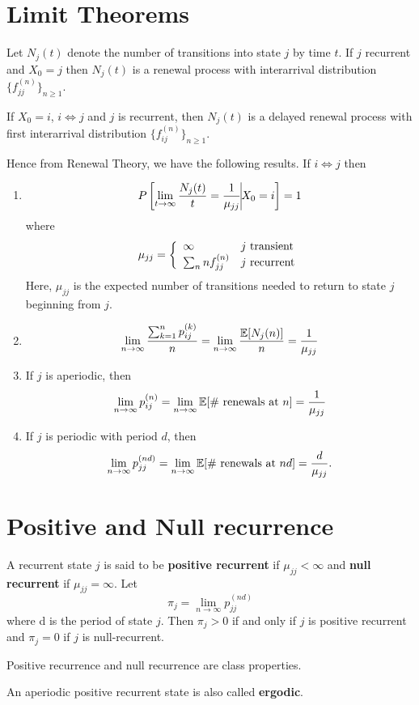 \documentclass[a4paper,10pt]{article}
\begin{document}
\section{Limit Theorems}
Let $N_j(t)$ denote the number of transitions into state $j$ by time $t$. If $j$ recurrent and $X_0 = j$ then $N_j(t)$ is a renewal process with interarrival distribution $\{f_{jj}^{(n)}\}_{n \geq 1}$. 

If $X_0 = i$, $i \iff j$ and $j$ is recurrent, then $N_j(t)$ is a
delayed renewal process with first interarrival distribution
$\{f_{ij}^{(n)}\}_{n \geq 1}$.

Hence from Renewal Theory, we have the following results. If $i \iff j$ then
\begin{enumerate}
	\item 
	\[P\left[ \lim_{t \to \infty} \frac{N_j(t)}{t}= \frac{1}{\mu_{jj}} \vline X_0 = i\right] = 1\]
	where
 \[\mu_{jj} = \left\{\begin{array}{l l}
	\infty & j \mbox{ transient} \\
	\sum_n n f_{jj}^{(n)} & j \mbox{ recurrent}	
	\end{array}\right.\]
      Here, $\mu_{jj}$ is the expected number of transitions needed to
      return to state $j$ beginning from $j$.
    \item
      \[\lim_{n \to \infty} \frac{\sum_{k=1}^n p_{ij}^{(k)}}{n} =
      \lim_{n \to \infty} \frac{\mathbb{E}[N_j(n)] }{n} =
      \frac{1}{\mu_{jj}}\]

	\item If $j$ is aperiodic, then \[ \lim_{n \to \infty} p_{ij}^{(n)} = \lim_{n \to \infty} \mathbb{E}[\# \mbox{ renewals at $n$}]  = \frac{1}{\mu_{jj}}\]
	\item If $j$ is periodic with period $d$, then \[ \lim_{n \to \infty} p_{jj}^{(nd)}= \lim_{n \to \infty} \mathbb{E}[\# \mbox{ renewals at $nd$}] = \frac{d}{\mu_{jj}}.\]
\end{enumerate}

\section{Positive and Null recurrence}
A recurrent state $j$ is said to be \textbf{positive recurrent} if $\mu_{jj} < \infty$ and \textbf{null recurrent} if $\mu_{jj} = \infty$. Let
\[\pi_j = \lim_{n \to \infty} p_{jj}^{(nd)}\]
where d is the period of state $j$. Then $\pi_j > 0$ if and only if $j$ is positive recurrent and $\pi_j = 0$ if  $j$ is null-recurrent. 

\begin{prop}
Positive recurrence and null recurrence are class properties.
\end{prop}
\begin{defn}
An aperiodic positive recurrent state is also called \textbf{ergodic}.
\end{defn}
\end{document}
